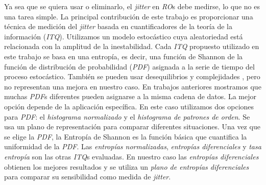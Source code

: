 Ya sea que se quiera usar o eliminarlo, el \textit{jitter} en \emph{RO}s debe medirse, lo que no es una tarea simple.
La principal contribución de este trabajo es proporcionar una técnica de medición del \textit{jitter} basada en cuantificadores de la teoría de la información (\emph{ITQ}).
Utilizamos un modelo estocástico cuya aleatoriedad está relacionada con la amplitud de la inestabilidad.
Cada \emph{ITQ} propuesto utilizado en este trabajo se basa en una entropía, es decir, una función de Shannon de la función de distribución de probabilidad (\emph{PDF}) asignada a la serie de tiempo del proceso estocástico.
También se pueden usar desequilibrios y complejidades \cite{Amigo2005,Rosso2007B}, pero no representan una mejora en nuestro caso.
En trabajos anteriores \cite{DeMicco2008, DeMicco2009} mostramos que muchas \emph{PDF}s diferentes pueden asignarse a la misma cadena de datos.
La mejor opción depende de la aplicación específica.
En este caso utilizamos dos opciones para \emph{PDF}: el \emph{histograma normalizado} y el \emph{histograma de patrones de orden}.
Se usa un plano de representación para comparar diferentes situaciones.
Una vez que se elige la \emph{PDF}, la Entropía de Shannon es la función básica que cuantifica la uniformidad de la \emph{PDF}.
Las \emph{entropías normalizadas}, \emph{entropías diferenciales} y \emph{tasa entropía} son las otras \emph{ITQ}s evaluadas.
En nuestro caso las \emph{entropías diferenciales} obtienen los mejores resultados y se utiliza un \emph{plano de entropías diferenciales} para comparar su sensibilidad como medida de \textit{jitter}.